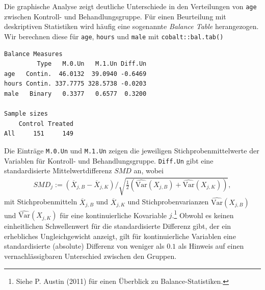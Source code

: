 \documentclass[
  a4paper,
  DIV=11,
  oneside]{scrreprt}
\newenvironment{Shaded}{\begin{snugshade}}{\end{snugshade}}
\newcommand{\AttributeTok}[1]{\textcolor[rgb]{0.40,0.45,0.13}{#1}}
\newcommand{\CommentTok}[1]{\textcolor[rgb]{0.37,0.37,0.37}{#1}}
\newcommand{\FunctionTok}[1]{\textcolor[rgb]{0.28,0.35,0.67}{#1}}
\newcommand{\NormalTok}[1]{\textcolor[rgb]{0.00,0.23,0.31}{#1}}
\newcommand{\SpecialCharTok}[1]{\textcolor[rgb]{0.37,0.37,0.37}{#1}}
\newcommand{\StringTok}[1]{\textcolor[rgb]{0.13,0.47,0.30}{#1}}
\begin{document}
Die graphische Analyse zeigt deutliche Unterschiede in den Verteilungen
von \texttt{age} zwischen Kontroll- und Behandlungsgruppe. Für einen
Beurteilung mit deskriptiven Statistiken wird häufig eine sogenannte
\emph{Balance Table} herangezogen. Wir berechnen diese für \texttt{age},
\texttt{hours} und \texttt{male} mit \texttt{cobalt::bal.tab()}

\begin{Shaded}
\end{Shaded}

\begin{verbatim}
Balance Measures
         Type   M.0.Un   M.1.Un Diff.Un
age   Contin.  46.0132  39.0940 -0.6469
hours Contin. 337.7775 328.5738 -0.0203
male   Binary   0.3377   0.6577  0.3200

Sample sizes
    Control Treated
All     151     149
\end{verbatim}

Die Einträge \texttt{M.0.Un} und \texttt{M.1.Un} zeigen die jeweiligen
Stichprobenmittelwerte der Variablen für Kontroll- und
Behandlungsgruppe. \texttt{Diff.Un} gibt eine standardisierte
Mittelwertdifferenz \(SMD\) an, wobei \begin{align*}
  SMD_j := \left(\overline{X}_{j,B} - \overline{X}_{j,K}\right) \bigg/ \sqrt{\frac{1}{2}\left(\widehat{\text{Var}}(X_{j,B}) + \widehat{\text{Var}}(X_{j,K})\right)},
\end{align*} mit Stichprobenmitteln \(\overline{X}_{j,B}\) und
\(\overline{X}_{j,K}\) und Stichprobenvarianzen
\(\widehat{\text{Var}}(X_{j,B})\) und \(\widehat{\text{Var}}(X_{j,K})\)
für eine kontinuierliche Kovariable \(j\).\footnote{Siehe P. Austin
  (2011) für einen Überblick zu Balance-Statistiken.} Obwohl es keinen
einheitlichen Schwellenwert für die standardisierte Differenz gibt, der
ein erhebliches Ungleichgewicht anzeigt, gilt für kontinuierliche
Variablen eine standardisierte (absolute) Differenz von weniger als
\(0.1\) als Hinweis auf einen vernachlässigbaren Unterschied zwischen
den Gruppen.
\end{document}
